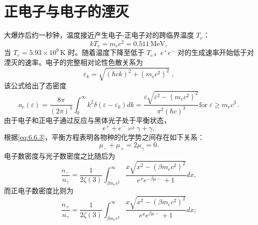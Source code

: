 \section{正电子与电子的湮灭}\label{ux6b63ux7535ux5b50ux4e0eux7535ux5b50ux7684ux6e6eux706d}
大爆炸后约一秒钟，温度接近产生电子-正电子对的跨临界温度 \(T_{e}\)：
\begin{equation}\tag{9.5.1}\label{eq:9.5.1}
k T _ { e } = m _ { e } c ^{2} = 0 . 51 1 \, \mathrm { M e V } ,
\end{equation}
当 \(T_{e}=5.93 \times 10^{9}\,\mathrm{K}\) 时。随着温度下降至低于 \(T_{e}\)，\(e^{+}e^{-}\) 对的生成速率开始低于对湮灭的速率。电子的完整相对论性色散关系为
\begin{equation}\tag{9.5.2}\label{eq:9.5.2}
\varepsilon _ { k } = \sqrt { ( \hbar c k ) ^{2} + ( m _ { e } c ^{2} ) ^{2} } \; ,
\end{equation}
该公式给出了态密度
\begin{equation}\tag{9.5.3}\label{eq:9.5.3}
a _ { e } ( \varepsilon ) = \frac { 8 \pi } { ( 2 \pi ) ^{3} } \int _ { 0 } ^{\infty} k ^{2} \delta ( \varepsilon - \varepsilon _ { k } ) d k = \frac { \varepsilon \sqrt { \varepsilon ^{2} - ( m _ { e } c ^{2} ) ^{2} } } { \pi ^{2} ( \hbar c ) ^{3} }  \mathrm { f o r } \; \varepsilon \ge m _ { e } c ^{2} \, .
\end{equation}
由于电子和正电子通过反应与黑体光子处于平衡状态，
\begin{equation}\tag{9.5.4}\label{eq:9.5.4}
e ^{+} + e ^{-} \rightleftharpoons \gamma + \gamma ,
\end{equation}
根据\autoref{eq:6.6.3}，平衡方程表明各物种的化学势之间存在如下关系：
\begin{equation}\tag{9.5.5}\label{eq:9.5.5}
\mu _ { - } + \mu _ { + } = 2 \mu _ { \gamma } = 0 .
\end{equation}
电子数密度与光子数密度之比随后为
\begin{equation}\tag{9.5.6}\label{eq:9.5.6}
\frac { n _ { - } } { n _ { \gamma } } = \frac { 1 } { 2 \zeta ( 3 ) } \int _ { \beta m _ { e } c ^{2} } ^{\infty} \frac { x \sqrt { x ^{2} - ( \beta m _ { e } c ^{2} ) ^{2} } } { e ^{x} e ^{- \beta \mu -} + 1 } d x ,
\end{equation}
而正电子数密度比则为
\begin{equation}\tag{9.5.7}\label{eq:9.5.7}
\frac { n _ { + } } { n _ { \gamma } } = \frac { 1 } { 2 \zeta ( 3 ) } \int _ { \beta m _ { e } c ^{2} } ^{\infty} \frac { x \sqrt { x ^{2} - ( \beta m _ { e } c ^{2} ) ^{2} } } { e ^{x} e ^{\beta \mu -} + 1 } d x ;
\end{equation}
